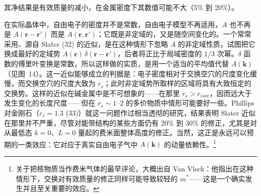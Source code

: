 
其净结果是有效质量的减小，在金属密度下其数值可能不大（5\% 到 20\%）。

在实际晶体中，自由电子的密度并不是常数，自由电子模型不再适用，$A$ 也不再是 $A(\mathbf{r}-\mathbf{r}')$ 而是 $A(\mathbf{r},\mathbf{r}')$；它既是非定域的，又是随空间变化的。一个常常采用、源自 Slater (32) 的近似，是在这种情形下忽略 $A$ 的非定域性质，试图把它换成最好的定域势 $A(\mathbf{r})\,\delta(\mathbf{r}-\mathbf{r}')$，后者将正比于局域密度的 $1/3$ 次幂。$\delta$ 函数的傅里叶变换是常数，所以这样做的实质，是用一个适当的平均值代替 $A(\mathbf{k})$（见图~14）。这一近似能够成立的判据是：电子密度相对于交换空穴的尺度变化缓慢，而交换空穴的尺度大致为 $r_s$；此时非定域势所取样的区域将具有大致恒定的交换势。这样的近似在碱金属中是不可想象的——在那里 $r_s > r_{\mathrm{core}}$，因而远大于发生变化的长度尺度——但在 $r_s \sim 1$--$2$ 的多价物质中情形可能要好一些。Phillips 对金刚石（$r_s = 1.3$ (33)）就这一问题作过相当透彻的研究，结果表明 Slater 近似在那里并不严重，尽管对能带结构的某些方面仍有 20\% 到 30\% 的修正，尤其是对从最低态 $k=0$、$L=0$ 量起的费米面整体高度的修正。当然，这正是永远可以预期的一类效应：它对应于真实自由电子气中 $A(\mathbf{k})$ 的动量依赖性。\footnote{关于把核物质当作费米气体的最早评论，大概出自 Van Vleck：他指出在这种情形下，交换对有效质量的修正同样可能导致较轻的 $m^*$——这是一个确实发生并且至关重要的效应。}
